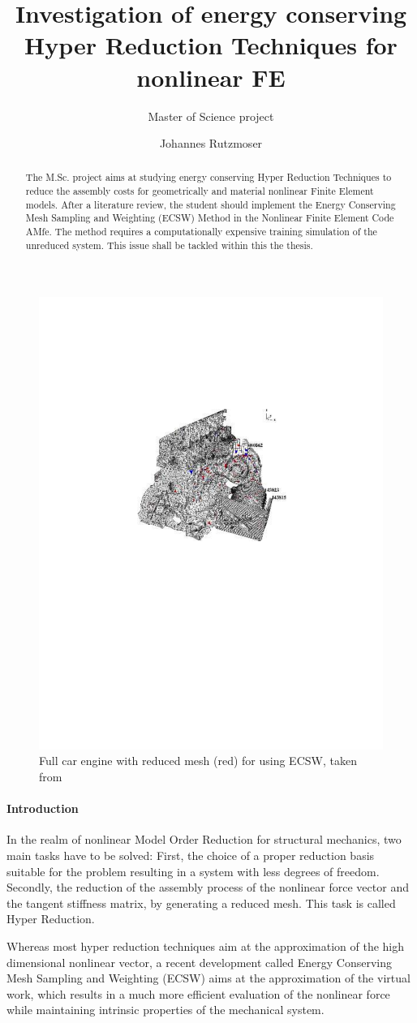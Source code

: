 \documentclass[10pt,a4paper]{AMdocument}
\title{Investigation of energy conserving Hyper Reduction Techniques for nonlinear FE}
\subtitle{Master of Science project}
\author{Johannes Rutzmoser}
\begin{document}
\maketitle

\begin{abstract}
   The M.Sc. project aims at studying energy conserving Hyper Reduction Techniques to reduce the assembly costs for geometrically and material nonlinear Finite Element models. After a literature review, the student should implement the Energy Conserving Mesh Sampling and Weighting (ECSW) Method in the Nonlinear Finite Element Code AMfe. The method requires a computationally expensive training simulation of the unreduced system. This issue shall be tackled within this the thesis. 
\end{abstract}

\begin{figure}[h]
   \centering
   \includegraphics[width=0.4\linewidth]{Bilder/farhat_engine.pdf}
   \caption{Full car engine with reduced mesh (red) for using ECSW, taken from \cite{farhat2015structure}}
\end{figure}

\paragraph{Introduction}
In the realm of nonlinear Model Order Reduction for structural mechanics, two main tasks have to be solved: 
First, the choice of a proper reduction basis suitable for the problem resulting in a system with less degrees of freedom. Secondly, the reduction of the assembly process of the nonlinear force vector and the tangent stiffness matrix, by generating a reduced mesh. This task is called Hyper Reduction. 

Whereas most hyper reduction techniques aim at the approximation of the high dimensional nonlinear vector, a recent development called Energy Conserving Mesh Sampling and Weighting (ECSW) aims at the approximation of the virtual work, which results in a much more efficient evaluation of the nonlinear force while maintaining intrinsic properties of the mechanical system. 
\end{document}
